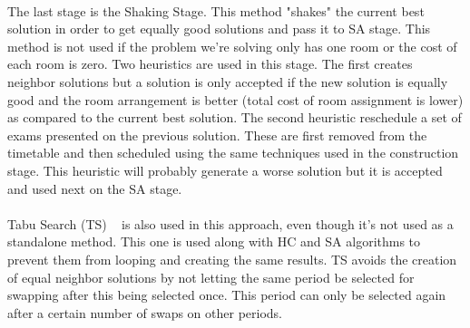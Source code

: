 \\
The last stage is the Shaking Stage. This method "shakes" the current best solution in order to get equally good solutions and pass it to SA stage. This method is not used if the problem we're solving only has one room or the cost of each room is zero. Two heuristics are used in this stage. The first creates neighbor solutions but a solution is only accepted if the new solution is equally good and the room arrangement is better (total cost of room assignment is lower) as compared to the current best solution. The second heuristic reschedule a set of exams presented on the previous solution. These are first removed from the timetable and then scheduled using the same techniques used in the construction stage. This heuristic will probably generate a worse solution but it is accepted and used next on the SA stage.\\
\\
Tabu Search (TS) ~\cite{Talbi2009} is also used in this approach, even though it's not used as a standalone method. This one is used along with HC and SA algorithms to prevent them from looping and creating the same results. TS avoids the creation of equal neighbor solutions by not letting the same period be selected for swapping after this being selected once. This period can only be selected again after a certain number of swaps on other periods.\\
\\



